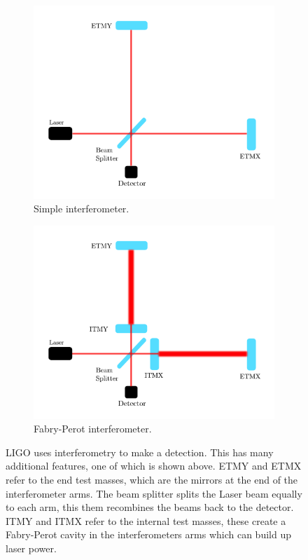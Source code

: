 \begin{figure}[hp]
    \centering
    \begin{subfigure}[h]{0.6\linewidth}
    	 \includegraphics[width=\textwidth]{C1_intro/interferometer.pdf}
    	 \caption{Simple interferometer.}
    	 \label{detectors:interferometer:simple}
    \end{subfigure}
	\begin{subfigure}[h]{0.6\linewidth}
		\includegraphics[width=\textwidth]{C1_intro/interferometer_fabry.pdf}
		\caption{Fabry-Perot interferometer.}
		\label{detectors:interferometer:fabry}
	\end{subfigure}
    \caption[Basic layout of the \gls{LIGO} detectors.]{\gls{LIGO} uses interferometry to make a detection. This has many additional features, one of which is shown above. ETMY and ETMX refer to the end test masses, which are the mirrors at the end of the interferometer arms. The beam splitter splits the Laser beam equally to each arm, this them recombines the beams back to the detector.
    ITMY and ITMX refer to the internal test masses, these create a Fabry-Perot cavity in the interferometers arms which can build up laser power. }
    \label{detectors:interferometer}
\end{figure}
